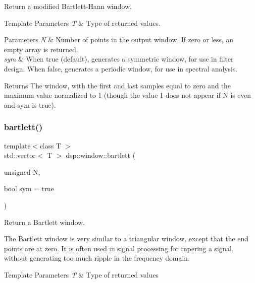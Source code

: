Return a modified Bartlett-\/\+Hann window. 


\begin{DoxyTemplParams}{Template Parameters}
{\em T} & Type of returned values. \\
\hline
\end{DoxyTemplParams}

\begin{DoxyParams}{Parameters}
{\em N} & Number of points in the output window. If zero or less, an empty array is returned. \\
\hline
{\em sym} & When true (default), generates a symmetric window, for use in filter design. When false, generates a periodic window, for use in spectral analysis. \\
\hline
\end{DoxyParams}
\begin{DoxyReturn}{Returns}
The window, with the first and last samples equal to zero and the maximum value normalized to 1 (though the value 1 does not appear if N is even and sym is true). 
\end{DoxyReturn}
\mbox{\label{namespacedsp_1_1window_a7b059f993849f7e9048b274071e76335}} 
\subsubsection{\texorpdfstring{bartlett()}{bartlett()}}
{\footnotesize\ttfamily template$<$class T $>$ \\
std\+::vector$<$ T $>$ dsp\+::window\+::bartlett (\begin{DoxyParamCaption}\item[{unsigned}]{N,  }\item[{bool}]{sym = {\ttfamily true} }\end{DoxyParamCaption})}



Return a Bartlett window. 

The Bartlett window is very similar to a triangular window, except that the end points are at zero. It is often used in signal processing for tapering a signal, without generating too much ripple in the frequency domain. 
\begin{DoxyTemplParams}{Template Parameters}
{\em T} & Type of returned values \\
\hline
\end{DoxyTemplParams}

